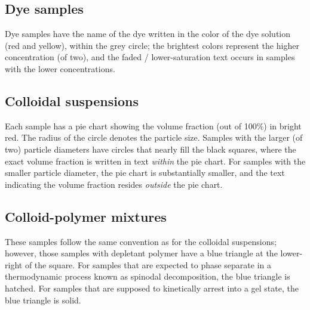 \subsection{Dye samples}\label{dye-samples}
Dye samples have the name of the dye written in the color of the dye solution
(red and yellow), within the grey circle; the brightest colors represent the
higher concentration (of two), and the faded / lower-saturation text occurs in
samples with the lower concentrations.

\subsection{Colloidal suspensions}\label{colloidal-suspensions}
Each sample has a pie chart showing the volume fraction (out of 100\%) in bright
red. The radius of the circle denotes the particle size. Samples with the larger
(of two) particle diameters have circles that nearly fill the black squares,
where the exact volume fraction is written in text \emph{within} the pie chart.
For samples with the smaller particle diameter, the pie chart is substantially
smaller, and the text indicating the volume fraction resides \emph{outside} the
pie chart.

\subsection{Colloid-polymer mixtures}\label{colloid-polymer-mixtures}
These samples follow the same convention as for the colloidal suspensions;
however, those samples with depletant polymer have a blue triangle at the
lower-right of the square. For samples that are expected to phase separate in a
thermodynamic process known as spinodal decomposition, the blue triangle is
hatched. For samples that are supposed to kinetically arrest into a gel state,
the blue triangle is solid.

